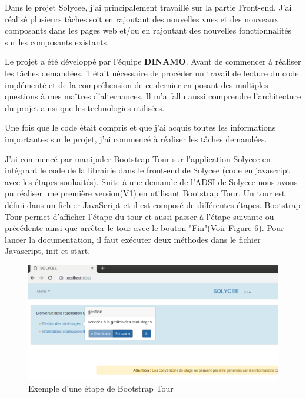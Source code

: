 \documentclass[12pt]{article}
\begin{document}
Dans le projet Solycee, j'ai principalement travaillé sur la partie Front-end. J'ai réalisé plusieurs tâches soit en rajoutant des nouvelles vues et des nouveaux composants dans les pages web et/ou en rajoutant des nouvelles fonctionnalités sur les composants existants.

Le projet a été développé par l'équipe \textbf{DINAMO}. Avant de commencer à réaliser les tâches demandées, il était nécessaire de procéder un travail  de lecture du code implémenté et de la compréhension de ce dernier en posant des multiples questions à mes maîtres d'alternances. Il m'a fallu aussi comprendre l'architecture du projet ainsi que les technologies utilisées. 

Une fois que le code était compris et que j'ai acquis toutes les informations importantes sur le projet, j'ai commencé à réaliser les tâches demandées.

J'ai commencé par manipuler Bootstrap Tour sur l'application Solycee en intégrant le code de la librairie dans le front-end de Solycee (code en javascript avec les étapes souhaités). Suite à une demande de l'ADSI de Solycee nous avons pu réaliser une première version(V1) en utilisant Bootstrap Tour. Un tour est défini dans un fichier JavaScript et il est composé de différentes étapes. Bootstrap Tour permet d'afficher l'étape du tour et aussi passer à l'étape suivante ou précédente ainsi que arrêter le tour avec le bouton "Fin"(Voir Figure 6). Pour lancer la documentation, il faut exécuter deux méthodes dans le fichier Javascript, init et start. 
\begin{figure}[H]
	\centering
 		\includegraphics[width=1\textwidth]{diagrammes/exemple_Tour.png} 
  		\caption{Exemple d'une étape de Bootstrap Tour}
	\end{figure}
\end{document}
